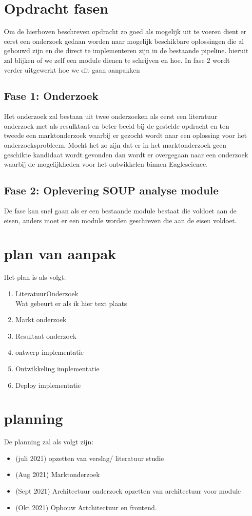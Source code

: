 \section{Opdracht fasen}
Om de hierboven beschreven opdracht zo goed als mogelijk uit te voeren dient er eerst een onderzoek gedaan worden naar mogelijk beschikbare oplossingen die al gebouwd zijn en die direct te implementeren zijn in de bestaande pipeline. hieruit zal blijken of we zelf een module dienen te schrijven en hoe. In fase 2 wordt verder uitgewerkt hoe we dit gaan aanpakken

\subsection{Fase 1: Onderzoek}
Het onderzoek zal bestaan uit twee onderzoeken als eerst een literatuur onderzoek met als resulktaat en beter beeld bij de gestelde opdracht en ten tweede een marktonderzoek waarbij er gezocht wordt naar een oplossing voor het onderzoeksprobleem. Mocht het zo zijn dat er in het marktonderzoek geen geschikte kandidaat wordt gevonden dan wordt er overgegaan naar een onderzoek waarbij de mogelijkheden voor het ontwikkelen binnen Eaglescience. 

\subsection{Fase 2: Oplevering SOUP analyse module}
De fase kan snel gaan als er een bestaande module bestaat die voldoet aan de eisen, anders moet er een module worden geschreven die aan de eisen voldoet. 

\section{plan van aanpak}
Het plan is als volgt:
\begin{enumerate}
\item LiteratuurOnderzoek
\\ Wat gebeurt er als ik hier text plaats
\item Markt onderzoek
\item Resultaat onderzoek
\item ontwerp implementatie
\item Ontwikkeling implementatie
\item Deploy implementatie
\end{enumerate}

\section{planning}
De planning zal als volgt zijn:
\begin{itemize}
\item (juli 2021) opzetten van verslag/ literatuur studie
\item (Aug 2021) Marktonderzoek
\item (Sept  2021) Architectuur onderzoek opzetten van architectuur voor module
\item (Okt 2021) Opbouw Artchitectuur en frontend. 
\end{itemize}




